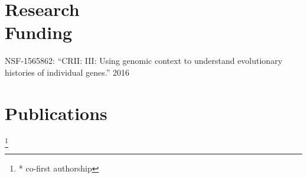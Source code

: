 \documentclass[margin,line,letterpaper]{resume}
\begin{document}
\begin{resume}
    \section{\mysidestyle Research\\Funding}
 NSF-1565862:  ``CRII: III: Using genomic context to understand evolutionary histories of individual genes.''
 \hfill 2016

\clearpage

    \renewcommand*{\thefootnote}{\fnsymbol{footnote}}
    \section{\mysidestyle Publications}

\newcommand\blfootnote[1]{%
  \begingroup
  \renewcommand\thefootnote{}\footnote{#1}%
  \addtocounter{footnote}{-1}%
  \endgroup
}
    
\def\FormatName#1{%
  \def\myname{Siavash Mirarab}
  \def\mynamee{Siavash Mirarab)*}%
  \edef\name{#1}%
  \ifx\name\myname
    \textbf{#1}%
  \else
    \ifx\name\mynamee
       \textbf{Siavash Mirarab})*%
    \else
      #1%
    \fi
  \fi
}

\vspace{-26pt}
\blfootnote{* co-first authorship}
\begin{spacing}{1.2}

\end{spacing}

\vspace{-10pt}


\end{resume}
\end{document}
